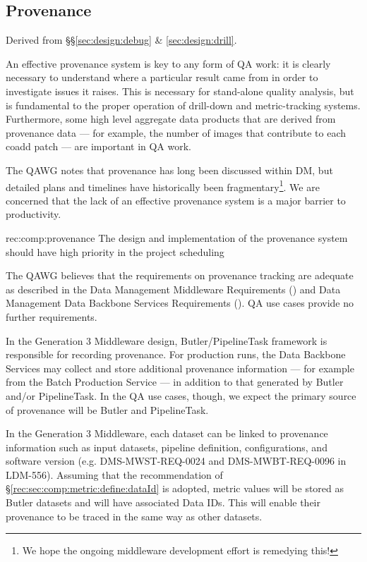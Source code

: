 \subsection{Provenance}
\label{sec:comp:provenance}

Derived from \S\S\ref{sec:design:debug} \& \ref{sec:design:drill}.

An effective provenance system is key to any form of QA work: it is clearly necessary to understand where a particular result came from in order to investigate issues it raises.
This is necessary for stand-alone quality analysis, but is fundamental to the proper operation of drill-down and metric-tracking systems.
Furthermore, some high level aggregate data products that are derived from provenance data --- for example, the number of images that contribute to each coadd patch --- are important in QA work.

The QAWG notes that provenance has long been discussed within DM, but detailed plans and timelines have historically been fragmentary\footnote{We hope the ongoing middleware development effort is remedying this!}.
We are concerned that the lack of an effective provenance system is a major barrier to productivity.

\begin{recommendation}
  {rec:comp:provenance}
  {The design and implementation of the provenance system should have high priority in the project scheduling}
\end{recommendation}

The QAWG believes that the requirements on provenance tracking are adequate as described in the Data Management Middleware Requirements () and Data Management Data Backbone Services Requirements ().
QA use cases provide no further requirements.

In the Generation 3 Middleware design, Butler/PipelineTask framework is responsible for recording provenance.
For production runs, the Data Backbone Services may collect and store additional provenance information --- for example from the Batch Production Service --- in addition to that generated by Butler and/or PipelineTask.
In the QA use cases, though, we expect the primary source of provenance will be Butler and PipelineTask.

In the Generation 3 Middleware, each dataset can be linked to provenance information such as input datasets, pipeline definition, configurations, and software version (e.g. DMS-MWST-REQ-0024 and DMS-MWBT-REQ-0096 in LDM-556).
Assuming that the recommendation of \S\ref{rec:sec:comp:metric:define:dataId} is adopted, \glspl{metric value} will be stored as Butler datasets and will have associated Data IDs.
This will enable their provenance to be traced in the same way as other datasets.

